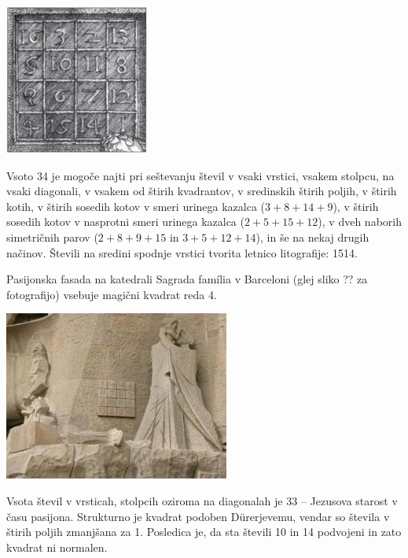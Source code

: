 \documentclass[a4paper,12pt]{article}
\begin{document}
\includegraphics[scale=1.3]{durer.png}

Vsoto 34 je mogoče najti pri seštevanju števil v vsaki vrstici, vsakem stolpcu,
na vsaki diagonali, v vsakem od štirih kvadrantov, v sredinskih štirih poljih,
v štirih kotih, v štirih sosedih kotov v smeri urinega kazalca ($3+8+14+9$), v
štirih sosedih kotov v nasprotni smeri urinega kazalca ($2+5+15+12$), v dveh naborih
simetričnih parov ($2+8+9+15$ in $3+5+12+14$), in še na nekaj drugih načinov.
Števili na sredini spodnje vrstici tvorita letnico litografije: 1514.
%

Pasijonska fasada na katedrali Sagrada família v Barceloni
(glej sliko ?? za fotografijo) vsebuje magični kvadrat reda 4.

\includegraphics{sagrada.png}

Vsota števil v vrsticah, stolpcih oziroma na diagonalah je 33 -- Jezusova starost
v času pasijona. Strukturno je kvadrat podoben Dürerjevemu, vendar so števila
v štirih poljih zmanjšana za 1. Posledica je, da sta števili 10 in 14 podvojeni
in zato kvadrat ni normalen.
%
\end{document}
